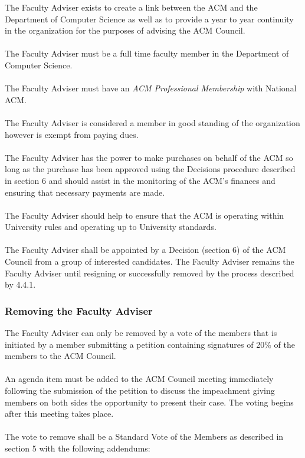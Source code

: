 \documentclass[12pt,titlepage]{article}
\begin{document}
The Faculty Adviser exists to create a link between the ACM and the Department of Computer Science as well as to provide a year to year continuity in the organization for the purposes of advising the ACM Council.\\
\\
The Faculty Adviser must be a full time faculty member in the Department of Computer Science.\\
\\
The Faculty Adviser must have an \emph{ACM Professional Membership} with National ACM.\\
\\
The Faculty Adviser is considered a member in good standing of the organization however is exempt from paying dues.\\
\\
The Faculty Adviser has the power to make purchases on behalf of the ACM so long as the purchase has been approved using the Decisions procedure described in section 6 and should assist in the monitoring of the ACM's finances and ensuring that necessary payments are made.\\
\\
The Faculty Adviser should help to ensure that the ACM is operating within University rules and operating up to University standards.\\
\\
The Faculty Adviser shall be appointed by a Decision (section 6) of the ACM Council from a group of interested candidates. The Faculty Adviser remains the Faculty Adviser until resigning or successfully removed by the process described by 4.4.1.

\subsubsection{Removing the Faculty Adviser}
The Faculty Adviser can only be removed by a vote of the members that is initiated by a member submitting a petition containing signatures of 20\% of the members to the ACM Council.\\
\\
An agenda item must be added to the ACM Council meeting immediately following the submission of the petition to discuss the impeachment giving members on both sides the opportunity to present their case. The voting begins after this meeting takes place.\\
\\
The vote to remove shall be a Standard Vote of the Members as described in section 5 with the following addendums:
\end{document}
